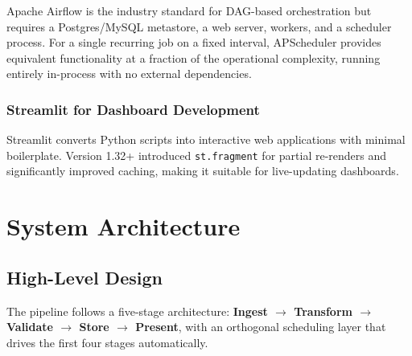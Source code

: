 \documentclass[12pt,a4paper]{report}
\begin{document}
Apache Airflow is the industry standard for DAG-based orchestration but requires a Postgres/MySQL metastore, a web server, workers, and a scheduler process. For a single recurring job on a fixed interval, APScheduler provides equivalent functionality at a fraction of the operational complexity, running entirely in-process with no external dependencies.

\subsection{Streamlit for Dashboard Development}

Streamlit converts Python scripts into interactive web applications with minimal boilerplate. Version 1.32+ introduced \texttt{st.fragment} for partial re-renders and significantly improved caching, making it suitable for live-updating dashboards.

\chapter{System Architecture}

\section{High-Level Design}

The pipeline follows a five-stage architecture: \textbf{Ingest $\rightarrow$ Transform $\rightarrow$ Validate $\rightarrow$ Store $\rightarrow$ Present}, with an orthogonal scheduling layer that drives the first four stages automatically.
\end{document}
